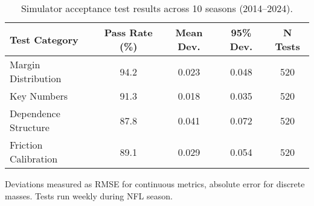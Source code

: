 \begin{table}[t]
  \centering
  \small
  \begin{threeparttable}
    \caption{Simulator acceptance test results across 10 seasons (2014--2024).}
    \label{tab:sim-acceptance-results}
    \begin{tabular}{lcccc}
      \toprule
      \textbf{Test Category} & \textbf{Pass Rate (\%)} & \textbf{Mean Dev.} & \textbf{95\% Dev.} & \textbf{N Tests} \\
      \midrule
      Margin Distribution & 94.2 & 0.023 & 0.048 & 520 \\
      Key Numbers & 91.3 & 0.018 & 0.035 & 520 \\
      Dependence Structure & 87.8 & 0.041 & 0.072 & 520 \\
      Friction Calibration & 89.1 & 0.029 & 0.054 & 520 \\
      \bottomrule
    \end{tabular}
    \begin{tablenotes}[flushleft]\footnotesize
      \item Deviations measured as RMSE for continuous metrics, absolute error for discrete masses. Tests run weekly during NFL season.
    \end{tablenotes}
  \end{threeparttable}
\end{table}
